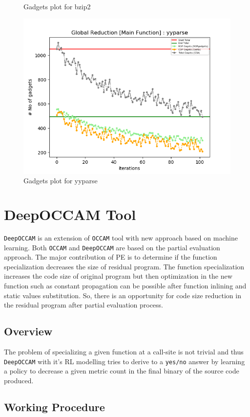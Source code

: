 \documentclass{relatorio}
\begin{document}
\begin{figure}[H]
	\caption{Gadgets plot for \color{blue} bzip2}%
	\label{fig:plant}
	\centering
	\captionsetup{justification=centering}
	\includegraphics[width=0.65\linewidth]{imgs/chisel_gadgets_yyparse_plot.png}
	\caption{Gadgets plot for \color{blue} yyparse}%
	\label{fig:plant}
\end{figure}

\section{DeepOCCAM Tool}%

\texttt{DeepOCCAM} is an extension of \texttt{OCCAM} tool with new approach based on machine learning. Both \texttt{OCCAM} and \texttt{DeepOCCAM} are based on the partial evaluation approach.
The major contribution of PE is to determine if the function specialization decreases the size of residual program. The function specialization increases the code
size of original program but then optimization in the new function  such as constant propagation can be possible after function inlining and static values substitution. So, there is an opportunity for code size reduction in the residual program after partial evaluation process. 

\subsection{Overview}%

The problem of specializing a given function at a call-site is not  trivial and thus \texttt{DeepOCCAM} with it's RL modelling tries to derive to a \texttt{yes/no} answer by learning a policy to decrease a given metric count in the final binary of the source code produced. 

\subsection{Working Procedure}%
\end{document}
